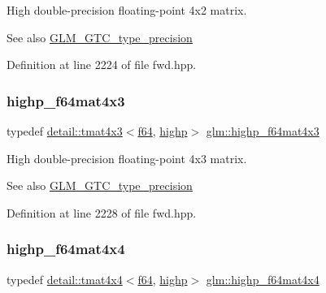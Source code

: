 High double-\/precision floating-\/point 4x2 matrix. \begin{DoxySeeAlso}{See also}
\hyperlink{group__gtc__type__precision}{G\+L\+M\+\_\+\+G\+T\+C\+\_\+type\+\_\+precision} 
\end{DoxySeeAlso}


Definition at line 2224 of file fwd.\+hpp.

\mbox{\label{group__gtc__type__precision_ga0264562b4667b8073b7708efc2280691}} 
\subsubsection{\texorpdfstring{highp\+\_\+f64mat4x3}{highp\_f64mat4x3}}
{\footnotesize\ttfamily typedef \hyperlink{structglm_1_1detail_1_1tmat4x3}{detail\+::tmat4x3}$<$\hyperlink{group__gtc__type__precision_ga2bba392e555124b36cde6abba349bab3}{f64}, \hyperlink{namespaceglm_a0f04f086094c747d227af4425893f545ac6f7eab42eacbb10d59a58e95e362074}{highp}$>$ \hyperlink{group__gtc__type__precision_ga0264562b4667b8073b7708efc2280691}{glm\+::highp\+\_\+f64mat4x3}}

High double-\/precision floating-\/point 4x3 matrix. \begin{DoxySeeAlso}{See also}
\hyperlink{group__gtc__type__precision}{G\+L\+M\+\_\+\+G\+T\+C\+\_\+type\+\_\+precision} 
\end{DoxySeeAlso}


Definition at line 2228 of file fwd.\+hpp.

\mbox{\label{group__gtc__type__precision_gaa95b52552df369b75d09155ebb29b1bd}} 
\subsubsection{\texorpdfstring{highp\+\_\+f64mat4x4}{highp\_f64mat4x4}}
{\footnotesize\ttfamily typedef \hyperlink{structglm_1_1detail_1_1tmat4x4}{detail\+::tmat4x4}$<$\hyperlink{group__gtc__type__precision_ga2bba392e555124b36cde6abba349bab3}{f64}, \hyperlink{namespaceglm_a0f04f086094c747d227af4425893f545ac6f7eab42eacbb10d59a58e95e362074}{highp}$>$ \hyperlink{group__gtc__type__precision_gaa95b52552df369b75d09155ebb29b1bd}{glm\+::highp\+\_\+f64mat4x4}}

